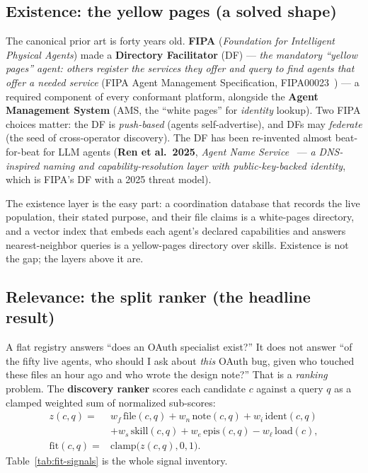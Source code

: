 \documentclass[11pt,a4paper]{article}
\theoremstyle{definition}
\theoremstyle{plain}
\begin{document}
\subsection{Existence: the yellow pages (a solved shape)}\label{sec:existence}

The canonical prior art is forty years old. \textbf{FIPA} (\emph{Foundation for
Intelligent Physical Agents}) made a \textbf{Directory Facilitator} (DF) ---
\emph{the mandatory ``yellow pages'' agent: others register the services they offer
and query to find agents that offer a needed service} (FIPA Agent Management
Specification, FIPA00023~) --- a required component of every conformant
platform, alongside the \textbf{Agent Management System} (AMS, the ``white pages'' for
\emph{identity} lookup). Two FIPA choices matter: the DF is \emph{push-based} (agents
self-advertise), and DFs may \emph{federate} (the seed of cross-operator discovery).
The DF has been re-invented almost beat-for-beat for LLM agents
(\textbf{Ren et al.\ 2025}, \emph{Agent Name Service}~ --- \emph{a
DNS-inspired naming and capability-resolution layer with public-key-backed identity},
which is FIPA's DF with a 2025 threat model).

The existence layer is the easy part: a coordination database that records the live
population, their stated purpose, and their file claims is a white-pages directory,
and a vector index that embeds each agent's declared capabilities and answers
nearest-neighbor queries is a yellow-pages directory over skills. Existence is not the
gap; the layers above it are.

\subsection{Relevance: the split ranker (the headline result)}\label{sec:relevance}

A flat registry answers ``does an OAuth specialist exist?'' It does not answer ``of
the fifty live agents, who should I ask about \emph{this} OAuth bug, given who
touched these files an hour ago and who wrote the design note?'' That is a
\emph{ranking} problem. The \textbf{discovery ranker} scores each candidate $c$
against a query $q$ as a clamped weighted sum of normalized sub-scores:
\begin{align}\label{eq:fit}
z(c,q) ={}& w_f\,\mathrm{file}(c,q) + w_n\,\mathrm{note}(c,q)
  + w_i\,\mathrm{ident}(c,q) \nonumber\\
 &+ w_s\,\mathrm{skill}(c,q) + w_e\,\mathrm{epis}(c,q)
  - w_\ell\,\mathrm{load}(c), \nonumber\\
\mathrm{fit}(c,q) ={}& \mathrm{clamp}\!\bigl(z(c,q),0,1\bigr).
\end{align}
Table~\ref{tab:fit-signals} is the whole signal inventory.
\end{document}
